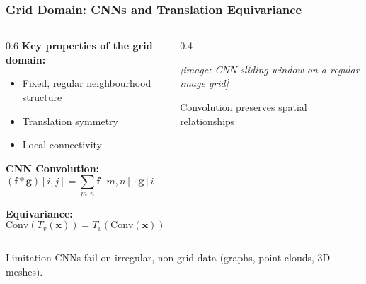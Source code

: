 \begin{frame}[fragile]\frametitle{Grid Domain: CNNs and Translation Equivariance}

\begin{columns}
\begin{column}{0.6\textwidth}
\textbf{Key properties of the grid domain:}
\begin{itemize}
\item Fixed, regular neighbourhood structure
\item Translation symmetry
\item Local connectivity
\end{itemize}

\vspace{0.3cm}
\textbf{CNN Convolution:}
$$(\mathbf{f} * \mathbf{g})[i,j] = \sum_{m,n} \mathbf{f}[m,n] \cdot \mathbf{g}[i-m, j-n]$$

\textbf{Equivariance:}
$$\text{Conv}(T_v(\mathbf{x})) = T_v(\text{Conv}(\mathbf{x}))$$
\end{column}
\begin{column}{0.4\textwidth}
\begin{center}
\textit{[image: CNN sliding window on a regular image grid]}

\vspace{0.3cm}
{\small Convolution preserves spatial relationships}
\end{center}
\end{column}
\end{columns}

\begin{alertblock}{Limitation}
CNNs fail on irregular, non-grid data (graphs, point clouds, 3D meshes).
\end{alertblock}

\end{frame}

